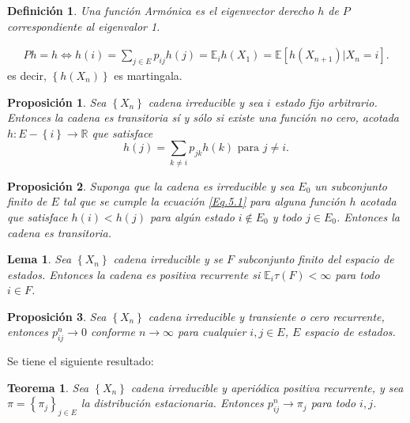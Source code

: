 \documentclass{article}
\newtheorem{Def}{Definición}[section]
\newtheorem{Teo}{Teorema}[section]
\newtheorem{Prop}{Proposición}[section]
\newtheorem{Lema}{Lema}[section]
\newcommand{\rea}{\mathbb{R}}
\newcommand{\esp}{\mathbb{E}}
\numberwithin{equation}{section}
\begin{document}
\begin{Def}\label{Def.Armonica}
Una funci\'on Arm\'onica es el eigenvector derecho $h$ de $P$ correspondiente al eigenvalor 1.
\end{Def}
\begin{eqnarray}
Ph=h\Leftrightarrow h\left(i\right)=\sum_{j\in E}p_{ij}h\left(j\right)=\esp_{i}h\left(X_{1}\right)=\esp\left[h\left(X_{n+1}\right)|X_{n}=i\right].
\end{eqnarray}
es decir, $\left\{h\left(X_{n}\right)\right\}$ es martingala.\\

\begin{Prop}\label{Prop.5.2}
Sea $\left\{X_{n}\right\}$ cadena irreducible  y sea $i$ estado fijo arbitrario. Entonces la cadena es transitoria s\'i y s\'olo si existe una funci\'on no cero, acotada $h:E-\left\{i\right\}\rightarrow\rea$ que satisface
\begin{equation}\label{Eq.5.1}
h\left(j\right)=\sum_{k\neq i}p_{jk}h\left(k\right)\textrm{   para }j\neq i.
\end{equation}
\end{Prop}

\begin{Prop}\label{Prop.5.4}
Suponga que la cadena es irreducible y sea $E_{0}$ un subconjunto finito de $E$ tal que se cumple la ecuaci\'on \ref{Eq.5.1} para alguna funci\'on $h$ acotada que satisface $h\left(i\right)<h\left(j\right)$ para alg\'un estado $i\notin E_{0}$ y todo $j\in E_{0}$. Entonces la cadena es transitoria.
\end{Prop}

\begin{Lema}
Sea $\left\{X_{n}\right\}$ cadena irreducible y se $F$ subconjunto finito del espacio de estados. Entonces la cadena es positiva recurrente si $\esp_{i}\tau\left(F\right)<\infty$ para todo $i\in F$.
\end{Lema}

\begin{Prop}
Sea $\left\{X_{n}\right\}$ cadena irreducible y transiente o cero recurrente, entonces $p_{ij}^{n}\rightarrow0$ conforme $n\rightarrow\infty$ para cualquier $i,j\in E$, $E$ espacio de estados.
\end{Prop}

Se tiene el siguiente resultado:

\begin{Teo}
Sea $\left\{X_{n}\right\}$ cadena irreducible y aperi\'odica positiva recurrente, y sea $\pi=\left\{\pi_{j}\right\}_{j\in E}$ la distribuci\'on estacionaria. Entonces $p_{ij}^{n}\rightarrow\pi_{j}$ para todo $i,j$.
\end{Teo}
\end{document}
